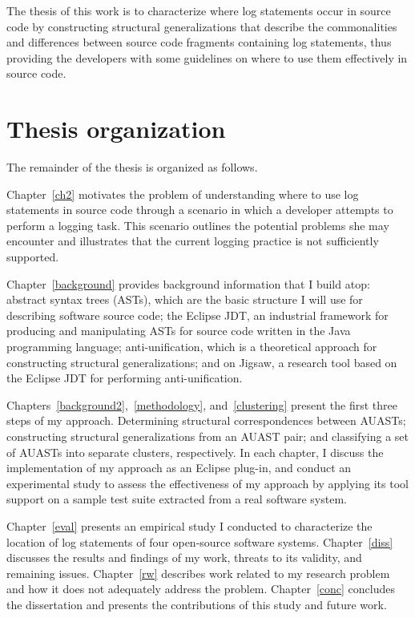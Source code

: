 The thesis of this work is to characterize where log statements occur in source code by constructing structural generalizations that describe the commonalities and differences between source code fragments containing log statements, thus providing the developers with some guidelines on where to use them effectively in source code.

\section{Thesis organization} \label{intro-org}
The remainder of the thesis is organized as follows.

Chapter~\ref{ch2} motivates the problem of understanding where to use log statements in source code through a scenario in which a developer attempts to perform a logging task. This scenario outlines the potential problems she may encounter and illustrates that the current logging practice is not sufficiently supported.

Chapter~\ref{background} provides background information that I build atop: abstract syntax trees (ASTs), which are the basic structure I will use for describing software source code; the Eclipse JDT, an industrial framework for producing and manipulating ASTs for source code written in the Java programming language; anti-unification, which is a theoretical approach for constructing structural generalizations; and on Jigsaw, a research tool based on the Eclipse JDT for performing anti-unification.


Chapters~\ref{background2},~\ref{methodology}, and~\ref{clustering} present the first three steps of my approach. Determining structural correspondences between AUASTs; constructing structural generalizations from an AUAST pair; and classifying a set of AUASTs into separate clusters, respectively. In each chapter, I discuss the implementation of my approach as an Eclipse plug-in, and conduct an experimental study to assess the effectiveness of my approach by applying its tool support on a sample test suite extracted from a real software system.



Chapter~\ref{eval} presents an empirical study I conducted to characterize the location of log statements of four open-source software systems. Chapter~\ref{diss} discusses the results and findings of my work, threats to its validity, and remaining issues. Chapter~\ref{rw} describes work related to my research problem and how it does not adequately address the problem. Chapter~\ref{conc} concludes the dissertation and presents the contributions of this study and future work. %



